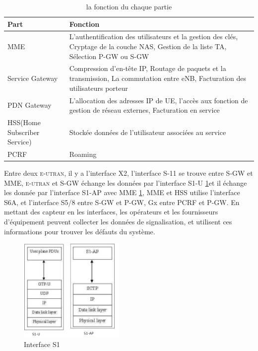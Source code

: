 \begin{table}[H]
	\begin{tabular}{|>{\centering\arraybackslash}p{2cm}|>{\centering\arraybackslash}p{11 cm}|}
		\hline Part &                     Fonction\\
		\hline MME & 
			L'authentification des utilisateurs et la gestion des clés,  Cryptage de la couche NAS,  Gestion de la liste TA, Sélection P-GW ou S-GW \\ 
		\hline Service Gateway & Compression d'en-tête IP, Routage de paquets et la transmission, La commutation entre eNB, Facturation des utilisateurs porteur \\ 
		\hline PDN Gateway & L'allocation des adresses IP de UE, l'accès aux fonction de gestion de réseau externes, Facturation en service \\ 
		\hline HSS(Home Subscriber Service) & Stockée données de l'utilisateur associées au service \\ 
		\hline PCRF & Roaming \\ 
		\hline 
	\end{tabular} 
	\caption{la fonction du chaque partie}
	\label{founction du chaque partie}
\end{table}    

Entre deux \textsc{e-utran}, il y a l'interface X2, l'interface S-11 se trouve entre S-GW et MME, \textsc{e-utran} et S-GW échange les données par l'interface S1-U \ref{Fig.S1}et il échange les donnée par l'interface S1-AP avec MME \ref{Fig.S1}, MME et HSS utilise l'interface S6A, et l'interface S5/8 entre S-GW et P-GW, Gx entre PCRF et P-GW. En mettant des capteur en les interfaces, les opérateurs et les fournisseurs d'équipement peuvent collecter les données de signalisation, et utilisent ces informations pour trouver les défauts du système. 
      \begin{figure}[H]
          \centering
          \includegraphics[width=2in]{images/S1-U.png}
          \caption{Interface S1}
          \label{Fig.S1}
      \end{figure}

